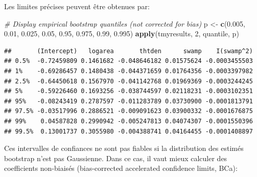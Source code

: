 \documentclass[
  12pt,
]{book}
\newenvironment{Shaded}{\begin{snugshade}}{\end{snugshade}}
\newcommand{\CommentTok}[1]{\textcolor[rgb]{0.56,0.35,0.01}{\textit{#1}}}
\newcommand{\DecValTok}[1]{\textcolor[rgb]{0.00,0.00,0.81}{#1}}
\newcommand{\FloatTok}[1]{\textcolor[rgb]{0.00,0.00,0.81}{#1}}
\newcommand{\KeywordTok}[1]{\textcolor[rgb]{0.13,0.29,0.53}{\textbf{#1}}}
\newcommand{\NormalTok}[1]{#1}
\newcommand{\StringTok}[1]{\textcolor[rgb]{0.31,0.60,0.02}{#1}}
\begin{document}
Les limites précises peuvent être obtenues par:

\begin{Shaded}
\begin{Highlighting}[]
\CommentTok{\# Display empirical bootstrap quantiles (not corrected for bias)}
\NormalTok{p \textless{}{-}}\StringTok{ }\KeywordTok{c}\NormalTok{(}\FloatTok{0.005}\NormalTok{, }\FloatTok{0.01}\NormalTok{, }\FloatTok{0.025}\NormalTok{, }\FloatTok{0.05}\NormalTok{, }\FloatTok{0.95}\NormalTok{, }\FloatTok{0.975}\NormalTok{, }\FloatTok{0.99}\NormalTok{, }\FloatTok{0.995}\NormalTok{)}
\KeywordTok{apply}\NormalTok{(tmyresults, }\DecValTok{2}\NormalTok{, quantile, p)}
\end{Highlighting}
\end{Shaded}

\begin{verbatim}
##       (Intercept)   logarea       thtden      swamp    I(swamp^2)
## 0.5%  -0.72459809 0.1461682 -0.048646182 0.01575624 -0.0003455503
## 1%    -0.69286457 0.1480438 -0.044371659 0.01764356 -0.0003397982
## 2.5%  -0.64450618 0.1567970 -0.041142768 0.01969369 -0.0003244245
## 5%    -0.59226460 0.1693256 -0.038744597 0.02118231 -0.0003102351
## 95%   -0.08243419 0.2787597 -0.011283789 0.03730900 -0.0001813791
## 97.5% -0.03517996 0.2886521 -0.009091623 0.03900332 -0.0001676875
## 99%    0.04587828 0.2990942 -0.005247813 0.04074307 -0.0001550396
## 99.5%  0.13001737 0.3055980 -0.004388741 0.04164455 -0.0001408897
\end{verbatim}

Ces intervalles de confiances ne sont pas fiables si la distribution des estimés bootstrap n'est pas Gaussienne. Dans ce cas, il vaut mieux calculer des coefficients non-biaisés (bias-corrected accelerated confidence limits, BCa):
\end{document}
